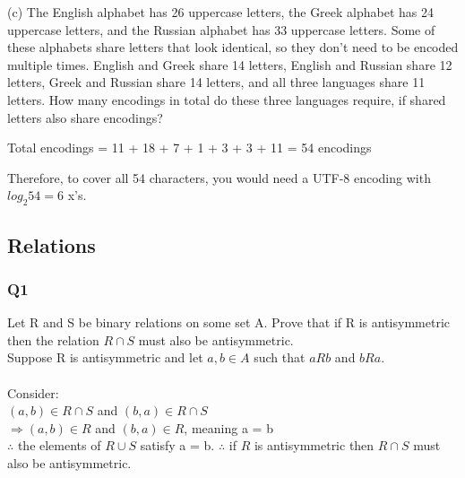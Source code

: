 \documentclass{article}
\begin{document}
(c) The English alphabet has 26 uppercase letters, the Greek alphabet has 24 uppercase
letters, and the Russian alphabet has 33 uppercase letters. Some of these alphabets
share letters that look identical, so they don’t need to be encoded multiple times.
English and Greek share 14 letters, English and Russian share 12 letters, Greek and
Russian share 14 letters, and all three languages share 11 letters. How many encodings
in total do these three languages require, if shared letters also share encodings?\\



Total encodings = 11 + 18 + 7 + 1 + 3 + 3 + 11 = 54 encodings

Therefore, to cover all 54 characters, you would need a UTF-8 encoding with $log_{2} 54 = 6$ x's. 



\newpage
\subsection{Relations}
\subsubsection{Q1}
Let R and S be binary relations on some set A. Prove that if R is antisymmetric then the relation $R\cap S$ must also be antisymmetric.\\
Suppose R is antisymmetric and let $a, b \in A$ such that $aRb$ and $bRa$.\\
\\
Consider:\\
$(a,b)\in R\cap S$ and $(b,a)\in R\cap S$\\
$\Rightarrow (a, b) \in R$ and $(b, a) \in R$, meaning a = b\\
$\therefore$ the elements of $R\cup S$ satisfy a = b.
$\therefore$ if $R$ is antisymmetric then $R\cap S$ must also be antisymmetric.
\end{document}
